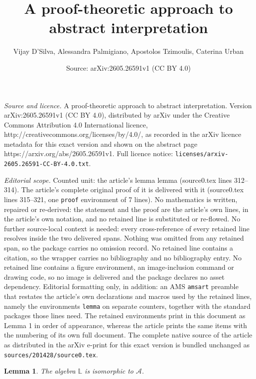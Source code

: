 \documentclass[10pt,a4paper]{amsart}
\title{A proof-theoretic approach to abstract interpretation}
\author{Vijay D'Silva, Alessandra Palmigiano, Apostolos Tzimoulis, Caterina Urban}
\date{Source: arXiv:2605.26591v1 (CC BY 4.0)}
\newtheorem{lemma}{Lemma}
\begin{document}
\maketitle

\noindent\emph{Source and licence.} A proof-theoretic approach to abstract interpretation. Version arXiv:2605.26591v1 (CC BY 4.0), distributed by arXiv under the Creative Commons Attribution 4.0 International licence, http://creativecommons.org/licenses/by/4.0/, as recorded in the arXiv licence metadata for this exact version and shown on the abstract page https://arxiv.org/abs/2605.26591v1. Full licence notice: \texttt{licenses/arxiv-2605.26591-CC-BY-4.0.txt}.\par\smallskip

\noindent\textit{Editorial scope.} Counted unit: the article's lemma lemma (source0.tex lines 312--314). The article's complete original proof of it is delivered with it (source0.tex lines 315--321, one \texttt{proof} environment of 7 lines). No mathematics is written, repaired or re-derived: the statement and the proof are the article's own lines, in the article's own notation, and no retained line is substituted or re-flowed.  No further source-local context is needed: every cross-reference of every retained line resolves inside the two delivered spans.  Nothing was omitted from any retained span, so the package carries no omission record.  No retained line contains a citation, so the wrapper carries no bibliography and no bibliography entry.  No retained line contains a figure environment, an image-inclusion command or drawing code, so no image is delivered and the package declares no asset dependency.  Editorial formatting only, in addition: an AMS \texttt{amsart} preamble that restates the article's own declarations and macros used by the retained lines, namely the environments \texttt{lemma} on separate counters, together with the standard packages those lines need.  The retained environments print in this document as Lemma 1 in order of appearance, whereas the article prints the same items with the numbering of its own full document.  The complete native source of the article as distributed in the arXiv e-print for this exact version is bundled unchanged as \texttt{sources/201428/source0.tex}.
\begin{lemma}
	The algebra $\mathbb{L}$ is isomorphic to $\mathcal{A}$.
\end{lemma}
\end{document}
